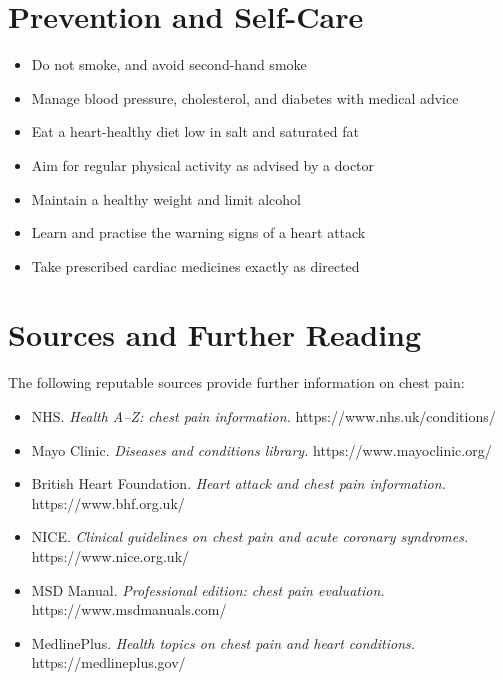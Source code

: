 \section*{Prevention and Self-Care}
\begin{itemize}
    \item Do not smoke, and avoid second-hand smoke
    \item Manage blood pressure, cholesterol, and diabetes with medical advice
    \item Eat a heart-healthy diet low in salt and saturated fat
    \item Aim for regular physical activity as advised by a doctor
    \item Maintain a healthy weight and limit alcohol
    \item Learn and practise the warning signs of a heart attack
    \item Take prescribed cardiac medicines exactly as directed
\end{itemize}

\section*{Sources and Further Reading}
The following reputable sources provide further information on chest pain:
\begin{itemize}
    \item NHS. \textit{Health A--Z: chest pain information.} https://www.nhs.uk/conditions/
    \item Mayo Clinic. \textit{Diseases and conditions library.} https://www.mayoclinic.org/
    \item British Heart Foundation. \textit{Heart attack and chest pain information.} https://www.bhf.org.uk/
    \item NICE. \textit{Clinical guidelines on chest pain and acute coronary syndromes.} https://www.nice.org.uk/
    \item MSD Manual. \textit{Professional edition: chest pain evaluation.} https://www.msdmanuals.com/
    \item MedlinePlus. \textit{Health topics on chest pain and heart conditions.} https://medlineplus.gov/
\end{itemize}
